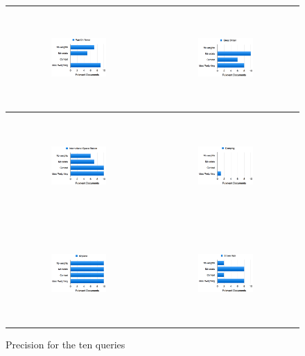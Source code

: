 \documentclass[a4paper]{article}
\begin{document}
\begin{figure}
\begin{center}
\begin{tabular}{ c | c }
\includegraphics[width=0.4\textwidth,height=10em]{05WarOnTerror} &
\includegraphics[width=0.4\textwidth,height=10em]{06GreatBritain}  \\ \hline \\
\includegraphics[width=0.4\textwidth,height=10em]{07InternationalSpaceStation} &
\includegraphics[width=0.4\textwidth,height=10em]{08Camping} \\ \hline \\
\includegraphics[width=0.4\textwidth,height=10em]{09Airplane} &
\includegraphics[width=0.4\textwidth,height=10em]{10BrownHair} \\ 
\end{tabular}
\caption{Precision for the ten queries}
\label{precision}
\end{center}
\end{figure}
\end{document}
